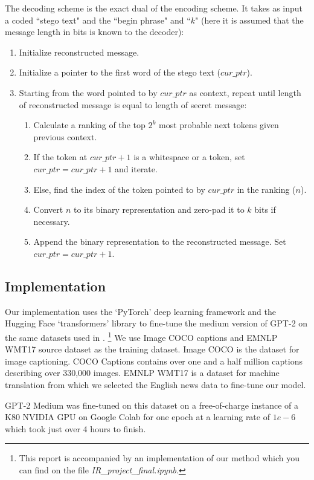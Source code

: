 \documentclass[journal,onecolumn]{IEEEtran}
\begin{document}
The decoding scheme is the exact dual of the encoding scheme. It takes as input a coded ``stego text" and the ``begin phrase" and ``$k$" (here it is assumed that the message length in bits is known to the decoder):
\begin{enumerate}
  \item Initialize reconstructed message.
  \item Initialize a pointer to the first word of the stego text ($cur\_ptr$).
  \item Starting from the word pointed to by $cur\_ptr$ as context, repeat until length of reconstructed message is equal to length of secret message:
  \begin{enumerate}
    \item Calculate a ranking of the top $2^k$ most probable next tokens given previous context.
    \item If the token at $cur\_ptr + 1$ is a whitespace or a token, set $cur\_ptr = cur\_ptr + 1$ and iterate.
    \item Else, find the index of the token pointed to by $cur\_ptr$ in the ranking ($n$).
    \item Convert $n$ to its binary representation and zero-pad it to $k$ bits if necessary.
    \item Append the binary representation to the reconstructed message. Set $cur\_ptr = cur\_ptr + 1$. 
  \end{enumerate}
\end{enumerate}

\subsection{Implementation}
Our implementation uses the `PyTorch' deep learning framework and the Hugging Face `transformers' library\cite{wolf-etal-2020-transformers} to fine-tune the medium version of GPT-2\cite{radford2019language} on the same datasets
used in \cite{yang2020gan}.
\footnote{This report is accompanied by an implementation of our method which you can find on the file \textit{IR\_project\_final.ipynb}.}
We use Image COCO captions and EMNLP WMT17 source dataset as the training dataset. Image COCO is the dataset for image captioning. COCO Captions contains over one and a half million captions describing over 330,000 images. EMNLP WMT17 is a dataset for machine translation from which we selected the English news data to fine-tune our model\cite{chen2015microsoft,noauthor_translation_nodate}.

GPT-2 Medium was fine-tuned on this dataset on a free-of-charge instance of a K80 NVIDIA GPU on Google Colab for one epoch at a learning rate of $1e-6$ which took just over 4 hours to finish.
\end{document}
